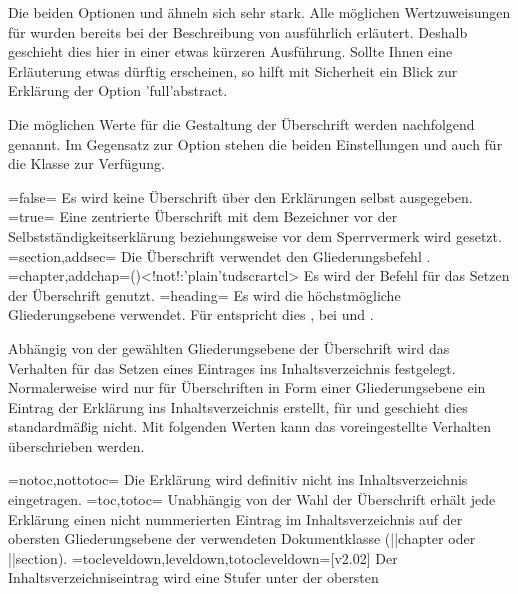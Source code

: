 \begin{DeclareEntity*}{}
\begin{DeclareEntity*}{}
\begin{DeclareEntity*}{}
\begin{Declaration}
Die beiden Optionen  und  ähneln sich sehr 
stark. Alle möglichen Wertzuweisungen für  wurden bereits 
bei der Beschreibung von  ausführlich erläutert. Deshalb 
geschieht dies hier in einer etwas kürzeren Ausführung. Sollte Ihnen eine 
Erläuterung etwas dürftig erscheinen, so hilft mit Sicherheit ein Blick zur 
Erklärung der Option \Option'full'{abstract}.

Die möglichen Werte für die Gestaltung der Überschrift werden nachfolgend 
genannt. Im Gegensatz zur Option  stehen die beiden 
Einstellungen  und  auch für 
die Klasse  zur Verfügung.
%
\begin{DeclareValues}
\itemval=false=
  Es wird keine Überschrift über den Erklärungen selbst ausgegeben.
\itemval*=true=
  Eine zentrierte Überschrift mit dem Bezeichner  vor 
  der Selbstständigkeitserklärung beziehungsweise  vor dem 
  Sperrvermerk wird gesetzt. 
\itemval=section,addsec=
  Die Überschrift verwendet den Gliederungsbefehl .
\itemval=chapter,addchap=()<!not!:\Class'plain'{tudscrartcl}>
  Es wird der Befehl  für das Setzen der Überschrift genutzt. 
\itemval=heading=
  Es wird die höchstmögliche Gliederungsebene verwendet. Für 
   entspricht dies , bei 
   und  .
\end{DeclareValues}
%
Abhängig von der gewählten Gliederungsebene der Überschrift wird das Verhalten 
für das Setzen eines Eintrages ins Inhaltsverzeichnis festgelegt. Normalerweise 
wird nur für Überschriften in Form einer Gliederungsebene ein Eintrag der 
Erklärung ins Inhaltsverzeichnis erstellt, für  und 
 geschieht dies standardmäßig nicht. Mit folgenden 
Werten kann das voreingestellte Verhalten überschrieben werden.
%
\begin{DeclareValues}
\itemval=notoc,nottotoc=
  Die Erklärung wird definitiv nicht ins Inhaltsverzeichnis eingetragen.
\itemval=toc,totoc=
  Unabhängig von der Wahl der Überschrift erhält jede Erklärung einen nicht
  nummerierten Eintrag im Inhaltsverzeichnis auf der obersten Gliederungsebene 
  der verwendeten Dokumentklasse (\Macro||{chapter} oder \Macro||{section}). 
\itemval=tocleveldown,leveldown,totocleveldown=[v2.02]
  Der Inhaltsverzeichniseintrag wird eine Stufer unter der obersten 

\end{DeclareValues}
\end{Declaration}
\end{DeclareEntity*}
\end{DeclareEntity*}
\end{DeclareEntity*}
